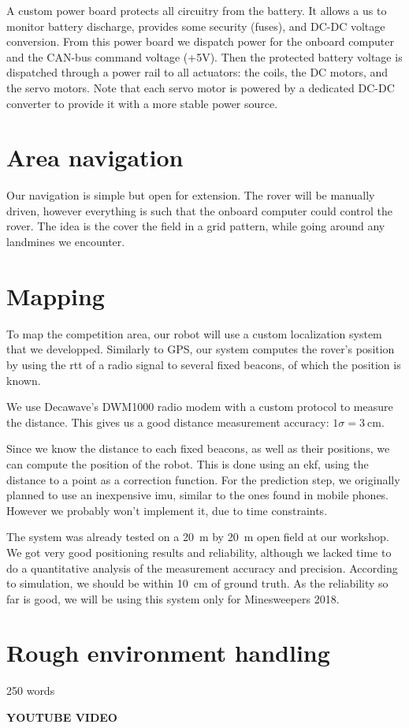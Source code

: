 A custom power board protects all circuitry from the battery.
It allows a us to monitor battery discharge, provides some security (fuses), and DC-DC voltage conversion.
From this power board we dispatch power for the onboard computer and the CAN-bus command voltage (+5V).
Then the protected battery voltage is dispatched through a power rail to all actuators: the coils, the DC motors, and the servo motors.
Note that each servo motor is powered by a dedicated DC-DC converter to provide it with a more stable power source.


\section{Area navigation}
Our navigation is simple but open for extension.
The rover will be manually driven, however everything is such that the onboard computer could control the rover.
The idea is the cover the field in a grid pattern, while going around any landmines we encounter.

\section{Mapping}

To map the competition area, our robot will use a custom localization system that we developped.
Similarly to GPS, our system computes the rover's position by using the \gls{rtt} of a radio signal to several fixed beacons, of which the position is known.

We use Decawave's DWM1000 radio modem with a custom protocol to measure the distance.
This gives us a good distance measurement accuracy: $1 \sigma = \SI{3}{\centi\meter}$.

Since we know the distance to each fixed beacons, as well as their positions, we can compute the position of the robot.
This is done using an \gls{ekf}, using the distance to a point as a correction function.
For the prediction step, we originally planned to use an inexpensive \gls{imu}, similar to the ones found in mobile phones.
However we probably won't implement it, due to time constraints.

The system was already tested on a \SI{20}{\meter} by \SI{20}{\meter} open field at our workshop.
We got very good positioning results and reliability, although we lacked time to do a quantitative analysis of the measurement accuracy and precision.
According to simulation, we should be within \SI{10}{\centi\meter} of ground truth.
As the reliability so far is good, we will be using this system only for Minesweepers 2018.


\section{Rough environment handling}

250 words

\textbf{YOUTUBE VIDEO}
